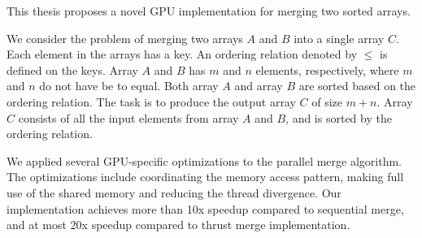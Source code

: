 
This thesis proposes a novel GPU implementation for merging two sorted arrays. 

We consider the problem of merging two arrays $A$ and $B$ into a single array $C$. 
Each element in the arrays has a key. An ordering relation denoted by $\leq$ 
is defined on the keys. Array $A$ and $B$ has $m$ and $n$ elements, respectively, 
where $m$ and $n$ do not have be to equal.  
Both array $A$ and array $B$ are sorted based on the ordering relation. 
The task is to produce the output array $C$ of size $m+n$.  
Array $C$ consists of all the input elements from array $A$ and $B$, and is 
sorted by the ordering relation. 

We applied several GPU-specific optimizations to the parallel merge algorithm. 
The optimizations include coordinating the memory access pattern, 
making full use of the shared memory and reducing the thread divergence.
Our implementation achieves more than 10x speedup compared to sequential merge, and
at most 20x speedup compared to thrust merge implementation.